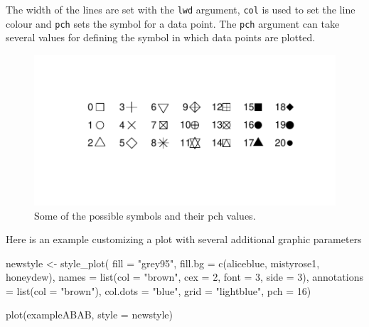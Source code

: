 \documentclass[
  letterpaper,
  DIV=11,
  numbers=noendperiod]{scrreprt}
\newenvironment{Shaded}{\begin{snugshade}}{\end{snugshade}}
\newcommand{\AttributeTok}[1]{\textcolor[rgb]{0.40,0.45,0.13}{#1}}
\newcommand{\DecValTok}[1]{\textcolor[rgb]{0.68,0.00,0.00}{#1}}
\newcommand{\FunctionTok}[1]{\textcolor[rgb]{0.28,0.35,0.67}{#1}}
\newcommand{\NormalTok}[1]{\textcolor[rgb]{0.00,0.23,0.31}{#1}}
\newcommand{\OtherTok}[1]{\textcolor[rgb]{0.00,0.23,0.31}{#1}}
\newcommand{\StringTok}[1]{\textcolor[rgb]{0.13,0.47,0.30}{#1}}
\begin{document}
The width of the lines are set with the \texttt{lwd} argument,
\texttt{col} is used to set the line colour and \texttt{pch} sets the
symbol for a data point. The \texttt{pch} argument can take several
values for defining the symbol in which data points are plotted.

\begin{figure}

{\centering \includegraphics{./app_supseded_functions_files/figure-pdf/symbols, pch-1.pdf}

}

\caption{Some of the possible symbols and their pch values.}

\end{figure}

Here is an example customizing a plot with several additional graphic
parameters

\begin{Shaded}
\begin{Highlighting}[]
\NormalTok{newstyle }\OtherTok{\textless{}{-}} \FunctionTok{style\_plot}\NormalTok{(}
  \AttributeTok{fill =} \StringTok{"grey95"}\NormalTok{,}
  \AttributeTok{fill.bg =} \FunctionTok{c}\NormalTok{(}\StringTok{\textquotesingle{}aliceblue\textquotesingle{}}\NormalTok{, }\StringTok{\textquotesingle{}mistyrose1\textquotesingle{}}\NormalTok{, }\StringTok{\textquotesingle{}honeydew\textquotesingle{}}\NormalTok{),}
  \AttributeTok{names =} \FunctionTok{list}\NormalTok{(}\AttributeTok{col =} \StringTok{"brown"}\NormalTok{, }\AttributeTok{cex =} \DecValTok{2}\NormalTok{, }\AttributeTok{font =} \DecValTok{3}\NormalTok{, }\AttributeTok{side =} \DecValTok{3}\NormalTok{),}
  \AttributeTok{annotations =} \FunctionTok{list}\NormalTok{(}\AttributeTok{col =} \StringTok{"brown"}\NormalTok{),}
  \AttributeTok{col.dots =} \StringTok{"blue"}\NormalTok{,}
  \AttributeTok{grid =} \StringTok{"lightblue"}\NormalTok{, }
  \AttributeTok{pch =} \DecValTok{16}\NormalTok{)}

\FunctionTok{plot}\NormalTok{(exampleABAB, }\AttributeTok{style =}\NormalTok{ newstyle)}
\end{Highlighting}
\end{Shaded}
\end{document}
